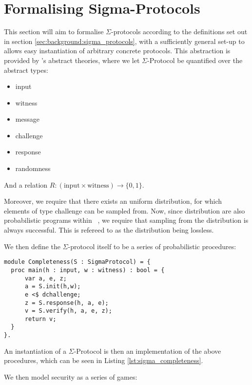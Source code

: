 \chapter{Formalising Sigma-Protocols}
\label{ch:formal_sigma}
This section will aim to formalise $\Sigma$-protocols according to the
definitions set out in section \ref{sec:background:sigma_protocols}, with a
sufficiently general set-up to allows easy instantiation of arbitrary concrete
protocols.
This abstraction is provided by \easycrypt's abstract theories, where we let
$\Sigma$-Protocol be quantified over the abstract types:
\begin{itemize}
  \item input
  \item witness
  \item message
  \item challenge
  \item response
  \item randomness
\end{itemize}

And a relation $R : (\text{input} \times \text{witness}) \rightarrow \{0,1\}$.

Moreover, we require that there exists an uniform distribution, for which
elements of type challenge can be sampled from. Now, since distribution are also
probabilistic programs within \easycrypt\ , we require that sampling from the
distribution is always successful. This is refereed to as the distribution being lossless.


We then define the $\Sigma$-protocol itself to be a series of probabilistic procedures:



\begin{lstlisting}[float, label=lst:sigma_completeness,caption=Completeness game for $\Sigma$-Protocols]
module Completeness(S : SigmaProtocol) = {
  proc main(h : input, w : witness) : bool = {
      var a, e, z;
      a = S.init(h,w);
      e <$ dchallenge;
      z = S.response(h, a, e);
      v = S.verify(h, a, e, z);
      return v;
  }
}.
\end{lstlisting}

An instantiation of a $\Sigma$-Protocol is then an implementation of the above
procedures, which can be seen in Listing \ref{lst:sigma_completeness}.

We then model security as a series of games:

